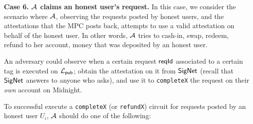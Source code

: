 \vspace{8pt}
\noindent
\textbf{Case 6.  $\mathcal{A}$ claims an honest user's request.}
In this case, we consider the scenario where $\mathcal{A}$, observing the
requests posted by honest users, and the attestations that
the MPC posts back, attempts to use a valid attestation on behalf of the honest user.
In other words, $\mathcal{A}$ tries  to cash-in, swap, redeem, refund to her account,   money that was deposited by an honest user.

 An adversary could observe when a certain request $\mathsf{reqId}$ associated to a certain tag
     is executed on $\mathcal{L}_{\mathsf{pub}}$;  obtain the attestation on it from $\mathsf{SigNet}$ (recall that $\mathsf{SigNet}$ answers to anyone who asks), and use it to  \texttt{completeX}  the request on their \emph{own} account on Midnight.

To successful execute a \texttt{completeX} (or \texttt{refundX}) circuit  for requests posted by an honest user $U_i$, $\mathcal{A}$ should do one of the following:

